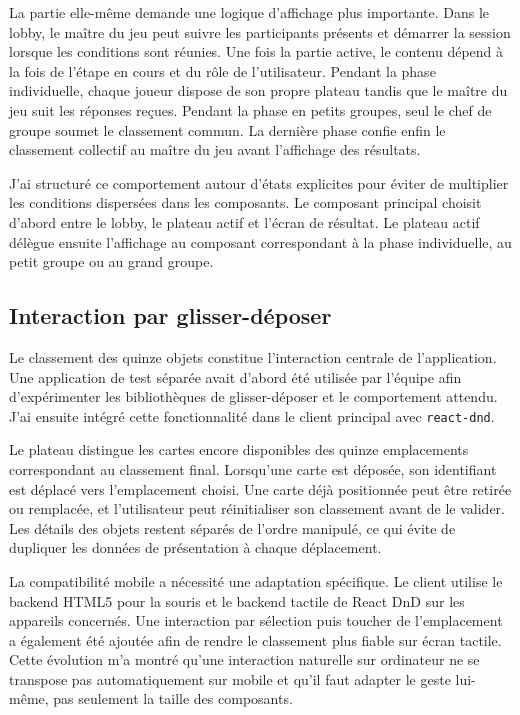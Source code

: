 La partie elle-même demande une logique d'affichage plus importante. Dans le lobby, le maître du jeu peut suivre les participants présents et démarrer la session lorsque les conditions sont réunies. Une fois la partie active, le contenu dépend à la fois de l'étape en cours et du rôle de l'utilisateur. Pendant la phase individuelle, chaque joueur dispose de son propre plateau tandis que le maître du jeu suit les réponses reçues. Pendant la phase en petits groupes, seul le chef de groupe soumet le classement commun. La dernière phase confie enfin le classement collectif au maître du jeu avant l'affichage des résultats.

J'ai structuré ce comportement autour d'états explicites pour éviter de multiplier les conditions dispersées dans les composants. Le composant principal choisit d'abord entre le lobby, le plateau actif et l'écran de résultat. Le plateau actif délègue ensuite l'affichage au composant correspondant à la phase individuelle, au petit groupe ou au grand groupe.

\subsection{Interaction par glisser-déposer}

Le classement des quinze objets constitue l'interaction centrale de l'application. Une application de test séparée avait d'abord été utilisée par l'équipe afin d'expérimenter les bibliothèques de glisser-déposer et le comportement attendu. J'ai ensuite intégré cette fonctionnalité dans le client principal avec \texttt{react-dnd}.

Le plateau distingue les cartes encore disponibles des quinze emplacements correspondant au classement final. Lorsqu'une carte est déposée, son identifiant est déplacé vers l'emplacement choisi. Une carte déjà positionnée peut être retirée ou remplacée, et l'utilisateur peut réinitialiser son classement avant de le valider. Les détails des objets restent séparés de l'ordre manipulé, ce qui évite de dupliquer les données de présentation à chaque déplacement.

La compatibilité mobile a nécessité une adaptation spécifique. Le client utilise le backend HTML5 pour la souris et le backend tactile de React DnD sur les appareils concernés. Une interaction par sélection puis toucher de l'emplacement a également été ajoutée afin de rendre le classement plus fiable sur écran tactile. Cette évolution m'a montré qu'une interaction naturelle sur ordinateur ne se transpose pas automatiquement sur mobile et qu'il faut adapter le geste lui-même, pas seulement la taille des composants.


